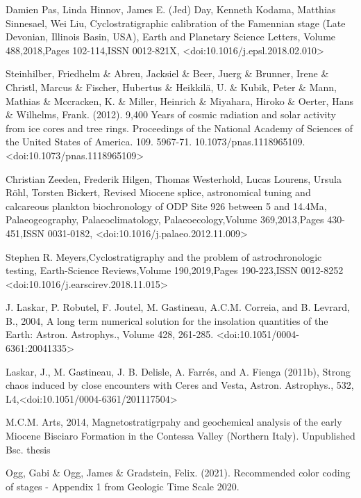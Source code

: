 \documentclass[a4paper]{book}
\begin{document}
\begin{References}
Damien Pas, Linda Hinnov, James E. (Jed) Day, Kenneth Kodama, Matthias Sinnesael, Wei Liu,
Cyclostratigraphic calibration of the Famennian stage (Late Devonian, Illinois Basin, USA),
Earth and Planetary Science Letters,
Volume 488,2018,Pages 102-114,ISSN 0012-821X,
<doi:10.1016/j.epsl.2018.02.010>

Steinhilber, Friedhelm \& Abreu, Jacksiel \& Beer, Juerg \& Brunner,
Irene \& Christl, Marcus \& Fischer, Hubertus \& Heikkilä, U. \& Kubik,
Peter \& Mann, Mathias \& Mccracken, K. \& Miller, Heinrich \& Miyahara,
Hiroko \& Oerter, Hans \& Wilhelms, Frank. (2012).
9,400 Years of cosmic radiation and solar activity from ice cores and tree rings.
Proceedings of the National Academy of Sciences of the United States of America.
109. 5967-71. 10.1073/pnas.1118965109.
<doi:10.1073/pnas.1118965109>

Christian Zeeden, Frederik Hilgen, Thomas Westerhold, Lucas Lourens, Ursula Röhl, Torsten Bickert,
Revised Miocene splice, astronomical tuning and calcareous plankton biochronology of ODP Site 926 between 5 and 14.4Ma,
Palaeogeography, Palaeoclimatology, Palaeoecology,Volume 369,2013,Pages 430-451,ISSN 0031-0182,
<doi:10.1016/j.palaeo.2012.11.009>

Stephen R. Meyers,Cyclostratigraphy and the problem of astrochronologic testing,
Earth-Science Reviews,Volume 190,2019,Pages 190-223,ISSN 0012-8252
<doi:10.1016/j.earscirev.2018.11.015>

J. Laskar, P. Robutel, F. Joutel, M. Gastineau, A.C.M. Correia, and B. Levrard, B., 2004,
A long term numerical solution for the insolation quantities of the Earth: Astron. Astrophys.,
Volume 428, 261-285. <doi:10.1051/0004-6361:20041335> \\{}

Laskar, J., M. Gastineau, J. B. Delisle, A. Farrés, and A. Fienga (2011b),
Strong chaos induced by close encounters with Ceres and Vesta, Astron. Astrophys.,
532, L4,<doi:10.1051/0004-6361/201117504> \\{}

M.C.M. Arts, 2014,
Magnetostratigrpahy and geochemical analysis of the early Miocene Bisciaro Formation
in the Contessa Valley (Northern Italy). Unpublished Bsc. thesis \\{}

Ogg, Gabi \& Ogg, James \& Gradstein, Felix. (2021).
Recommended color coding of stages - Appendix 1
from Geologic Time Scale 2020.
\end{References}
\end{document}
